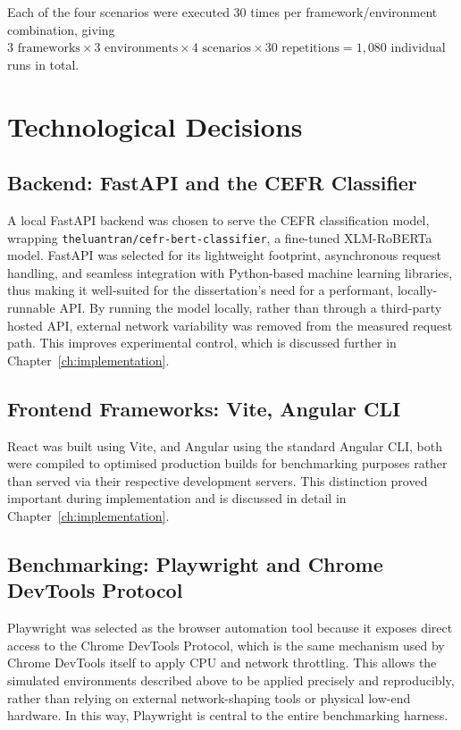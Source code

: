 \documentclass[11pt,a4paper]{report}
\begin{document}
Each of the four scenarios were executed 30 times per framework/environment combination, giving $3 \text{ frameworks} \times 3 \text{ environments} \times 4 \text{ scenarios} \times 30 \text{ repetitions} = 1{,}080$ individual runs in total.

\section{Technological Decisions}

\subsection{Backend: FastAPI and the CEFR Classifier}

A local FastAPI backend was chosen to serve the CEFR classification model, wrapping \texttt{theluantran/cefr-bert-classifier}, a fine-tuned XLM-RoBERTa model. FastAPI was selected for its lightweight footprint, asynchronous request handling, and seamless integration with Python-based machine learning libraries, thus making it well-suited for the dissertation's need for a performant, locally-runnable API. By running the model locally, rather than through a third-party hosted API, external network variability was removed from the measured request path. This improves experimental control, which is discussed further in Chapter~\ref{ch:implementation}.


\subsection{Frontend Frameworks: Vite, Angular CLI}

React was built using Vite, and Angular using the standard Angular CLI, both were compiled to optimised production builds for benchmarking purposes rather than served via their respective development servers. This distinction proved important during implementation and is discussed in detail in Chapter~\ref{ch:implementation}.


\subsection{Benchmarking: Playwright and Chrome DevTools Protocol}

Playwright was selected as the browser automation tool because it exposes direct access to the Chrome DevTools Protocol, which is the same mechanism used by Chrome DevTools itself to apply CPU and network throttling. This allows the simulated environments described above to be applied precisely and reproducibly, rather than relying on external network-shaping tools or physical low-end hardware. In this way, Playwright is central to the entire benchmarking harness.
\end{document}
